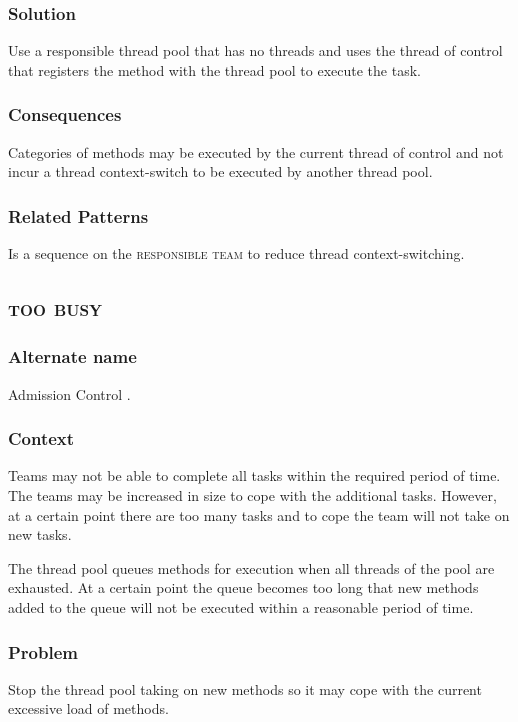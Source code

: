 \documentclass[prodmode]{style/acmlarge}
\begin{document}
\subsubsection*{Solution} Use a responsible thread pool that has no threads and
uses the thread of control that registers the method with the thread pool to
execute the task.

\subsubsection*{Consequences} Categories of methods may be executed by the
current thread of control and not incur a thread context-switch to be executed
by another thread pool.

\subsubsection*{Related Patterns} Is a sequence on the \textsc{responsible team}
to reduce thread context-switching.



\subsection{\textsc{\textbf{too busy}}}

\subsubsection*{Alternate name} Admission Control \cite{seda}. 

\subsubsection*{Context} Teams may not be able to complete all tasks within the
required period of time.  The teams may be increased in size to cope with the
additional tasks.  However, at a certain point there are too many tasks and to
cope the team will not take on new tasks.

The thread pool queues methods for execution when all threads of the pool are
exhausted.  At a certain point the queue becomes too long that new methods added
to the queue will not be executed within a reasonable period of time.

\subsubsection*{Problem} Stop the thread pool taking on new methods so it may
cope with the current excessive load of methods.
\end{document}
